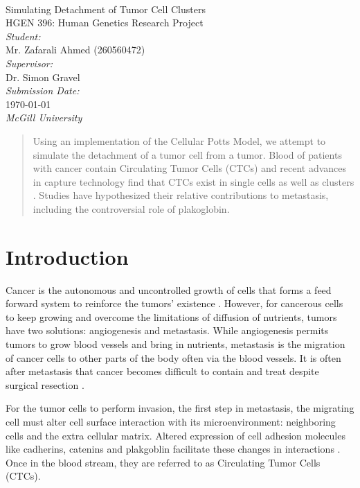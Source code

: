 \documentclass[12pt]{article}
\begin{document}
\begin{titlepage}
	\begin{center}
		~\\[2.5cm]
		{\Huge Simulating Detachment of Tumor Cell Clusters}\\[1.5cm]
		{\Large HGEN 396: Human Genetics Research Project}\\[7.5cm]
		\emph{Student:}\\
		Mr. Zafarali Ahmed (260560472)\\[1.0cm]
		\emph{Supervisor:}\\
		Dr. Simon Gravel\\[1.0cm]
		\emph{Submission Date:}\\
		\today\\
		\emph{McGill University}
	\end{center}
\end{titlepage}

\begin{abstract}
Using an implementation of the Cellular Potts Model, we attempt to simulate the detachment of a tumor cell from a tumor. Blood of patients with cancer contain Circulating Tumor Cells (CTCs) and recent advances in capture technology find that CTCs exist in single cells as well as clusters \cite{Aceto2014}. Studies have hypothesized their relative contributions to metastasis, including the controversial role of plakoglobin. 
\end{abstract}

\section{Introduction}
Cancer is the autonomous and uncontrolled growth of cells that forms a feed forward system to reinforce the tumors’ existence \cite{hallmarks}. However, for cancerous cells to keep growing and overcome the limitations of diffusion of nutrients, tumors have two solutions: angiogenesis and metastasis. While angiogenesis permits tumors to grow blood vessels and bring in nutrients, metastasis is the migration of cancer cells to other parts of the body often via the blood vessels. It is often after metastasis that cancer becomes difficult to contain and treat despite surgical resection \cite{Hatzikirou2012}.

For the tumor cells to perform invasion, the first step in metastasis, the migrating cell must alter cell surface interaction with its microenvironment: neighboring cells and the extra cellular matrix. Altered expression of cell adhesion molecules like cadherins, catenins and plakgoblin facilitate these changes in interactions \cite{Aktary2012}. Once in the blood stream, they are referred to as Circulating Tumor Cells (CTCs).
\end{document}
